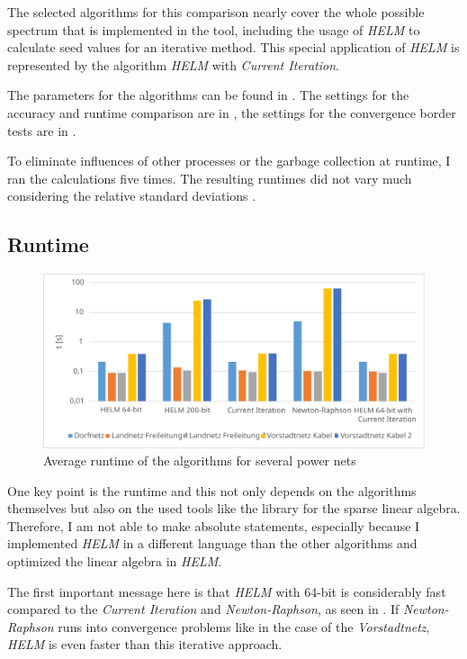 The selected algorithms for this comparison nearly cover the whole possible spectrum that is implemented in the tool, including the usage of \emph{HELM} to calculate seed values for an iterative method. This special application of \emph{HELM} is represented by the algorithm \emph{HELM} with \emph{Current Iteration}.

The parameters for the algorithms can be found in . The settings for the accuracy and runtime comparison are in , the settings for the convergence border tests are in .

To eliminate influences of other processes or the garbage collection at runtime, I ran the calculations five times. The resulting runtimes did not vary much considering the relative standard deviations .

\subsection{Runtime}

\begin{figure}
	\centering
	\includegraphics[scale=0.7]{figures/comparison_runtime}
	\caption[Comparison, average runtime]{Average runtime of the algorithms for several power nets}
	\label{fig:comparison_runtime}
\end{figure}

One key point is the runtime and this not only depends on the algorithms themselves but also on the used tools like the library for the sparse linear algebra. Therefore, I am not able to make absolute statements, especially because I implemented \emph{HELM} in a different language than the other algorithms and optimized the linear algebra in \emph{HELM}.

The first important message here is that \emph{HELM} with 64-bit is considerably fast compared to the \emph{Current Iteration} and \emph{Newton-Raphson}, as seen in . If \emph{Newton-Raphson} runs into convergence problems like in the case of the \emph{Vorstadtnetz}, \emph{HELM} is even faster than this iterative approach. 

